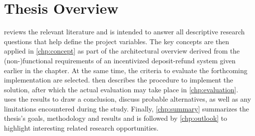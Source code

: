 
\section{Thesis Overview}
 reviews the relevant literature and is intended to answer all descriptive research questions that help define the project variables. The key concepts are then applied in \cref{chp:concept} as part of the architectural overview derived from the (non-)functional requirements of an incentivized deposit-refund system given earlier in the chapter. At the same time, the criteria to evaluate the forthcoming implementation are selected.  then describes the procedure to implement the solution, after which the actual evaluation may take place in \cref{chp:evaluation}.  uses the results to draw a conclusion, discuss probable alternatives, as well as any limitations encountered during the study. Finally, \cref{chp:summary} summarizes the thesis's goals, methodology and results and is followed by \cref{chp:outlook} to highlight interesting related research opportunities.






